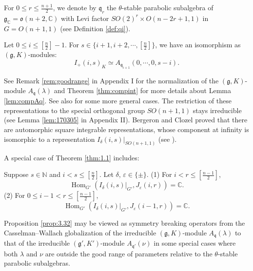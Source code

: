 For $0 \le r \le \frac{n+1}{2}$, 
 we denote by
 ${\mathfrak{q}}_r$ the $\theta$-stable parabolic subalgebra
 of ${\mathfrak{g}}_{\mathbb{C}}={\mathfrak{o}}(n+2,{\mathbb{C}})$
 with Levi factor $SO(2)^r \times O(n-2r+1,1)$
 in $G=O(n+1,1)$
 (see Definition \ref{def:qi}).  
\begin{lemma}
\label{lem:compAq}
Let $0 \le i \le [\frac n 2]-1$.  
For $s \in \{i+1,i+2,\cdots,[\frac n 2]\}$, 
 we have an isomorphism as $({\mathfrak{g}},K)$-modules:
\[
  I_+(i,s)_K \simeq A_{\mathfrak{q}_{i+1}}(0,\cdots,0,s-i).  
\]
\end{lemma}
See Remark \ref{rem:goodrange} in Appendix I
 for the normalization 
 of the $({\mathfrak{g}},K)$-module $A_{\mathfrak{q}}(\lambda)$
 and Theorem \ref{thm:compint} for more details
 about Lemma \ref{lem:compAq}.  
See also \cite[Thm.~3]{KMemoirs92} for some more general cases.  
The restriction of these representations
 to the special orthogonal group $SO(n+1,1)$ stays irreducible
 (see Lemma \ref{lem:170305} in Appendix II). 
Bergeron and Clozel proved
 that there are  automorphic square integrable representations,
 whose component at infinity is isomorphic
 to a representation $I_\delta(i,s)|_{SO(n+1,1)}$
 (see \cite{BC, BLS}). 

A special case of Theorem \ref{thm:1.1} includes:
\begin{proposition}
\label{prop:3.32}
Suppose $s \in {\mathbb{N}}$ and $i < s \le [\frac n 2]$.  
Let $\delta$, $\varepsilon \in \{\pm\}$.  
\newline\noindent
{\rm{(1)}}\enspace
For $i < r \le [\frac{n-1}2]$, 
\[ 
   {\operatorname{Hom}}_{G'}(I_{\delta}(i,s)|_{G'},J_{\varepsilon}(i,r))
 = {\mathbb{C}}.  
\]
\newline\noindent
{\rm{(2)}}\enspace
For $0 \le i-1 <r \le [\frac{n-1}{2}]$, 
\[  
   {\operatorname{Hom}}_{G'}(I_{\delta}(i,s)|_{G'},J_{\varepsilon}(i-1,r)) = {\mathbb{C}}.  
\]
\end{proposition}


\begin{remark}
Proposition \ref{prop:3.32} may be viewed as symmetry breaking operators from 
 the Casselman--Wallach globalization
 of the irreducible $({\mathfrak{g}},K)$-module $A_{\mathfrak{q}}(\lambda)$ to that of the irreducible $({\mathfrak{g}}',K')$-module $A_{\mathfrak{q}'}(\nu)$
 in some special cases 
 where both $\lambda$ and $\nu$ are 
 outside the good range of parameters
 relative to the $\theta$-stable parabolic subalgebras.  
\end{remark}

